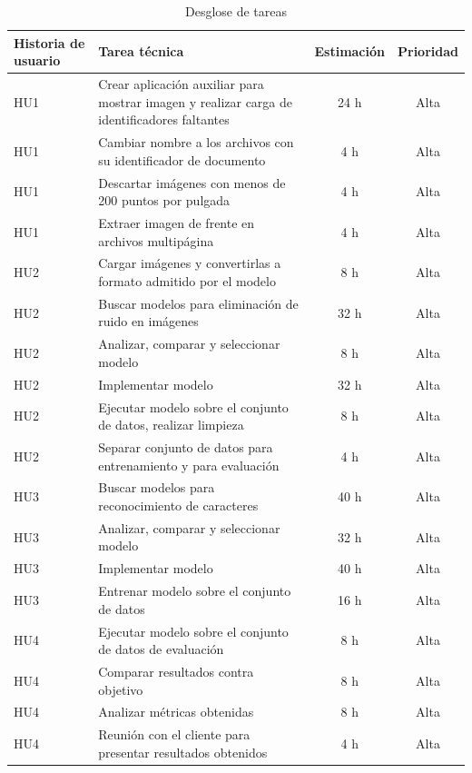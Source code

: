 \documentclass[
11pt, %
]{charter}
\begin{document}
\begin{table}[H]
\caption{Desglose de tareas}
\centering
\begin{tabularx}{\linewidth}{@{}|l|X|c|c|@{}}
\hline
\rowcolor[HTML]{C0C0C0}
Historia de usuario & Tarea técnica & Estimación & Prioridad \\ \hline
HU1 & Crear aplicación auxiliar para mostrar imagen y realizar carga de identificadores faltantes & 24 h & Alta \\ \hline
HU1 & Cambiar nombre a los archivos con su identificador de documento & 4 h & Alta \\ \hline
HU1 & Descartar imágenes con menos de 200 puntos por pulgada & 4 h & Alta \\ \hline
HU1 & Extraer imagen de frente en archivos multipágina & 4 h & Alta \\ \hline

HU2 & Cargar imágenes y convertirlas a formato admitido por el modelo & 8 h & Alta \\ \hline
HU2 & Buscar modelos para eliminación de ruido en imágenes & 32 h & Alta \\ \hline
HU2 & Analizar, comparar y seleccionar modelo & 8 h & Alta \\ \hline
HU2 & Implementar modelo & 32 h & Alta \\ \hline
HU2 & Ejecutar modelo sobre el conjunto de datos, realizar limpieza & 8 h & Alta \\ \hline
HU2 & Separar conjunto de datos para entrenamiento y para evaluación & 4 h & Alta \\ \hline

HU3 & Buscar modelos para reconocimiento de caracteres & 40 h & Alta \\ \hline
HU3 & Analizar, comparar y seleccionar modelo & 32 h & Alta \\ \hline
HU3 & Implementar modelo & 40 h & Alta \\ \hline
HU3 & Entrenar modelo sobre el conjunto de datos & 16 h & Alta \\ \hline

HU4 & Ejecutar modelo sobre el conjunto de datos de evaluación & 8 h & Alta \\ \hline
HU4 & Comparar resultados contra objetivo & 8 h & Alta \\ \hline
HU4 & Analizar métricas obtenidas & 8 h & Alta \\ \hline
HU4 & Reunión con el cliente para presentar resultados obtenidos & 4 h & Alta \\ \hline

\end{tabularx}
\end{table}
\end{document}
